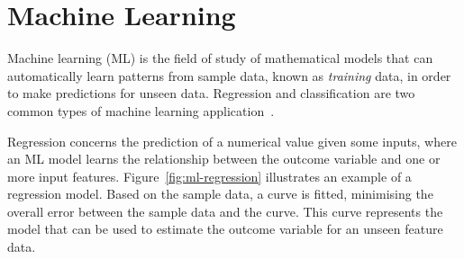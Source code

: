 
\section{Machine Learning}

Machine learning (ML) is the field of study of mathematical models that can automatically learn patterns from sample data, known as \textit{training} data, in order to make predictions for unseen data.
Regression and classification are two common types of machine learning application~\cite{goodfellow16}.

Regression concerns the prediction of a numerical value given some inputs, where an ML model learns the relationship between the outcome variable and one or more input features.
Figure~\ref{fig:ml-regression} illustrates an example of a regression model.
Based on the sample data, a curve is fitted, minimising the overall error between the sample data and the curve.
This curve represents the model that can be used to estimate the outcome variable for an unseen feature data.

